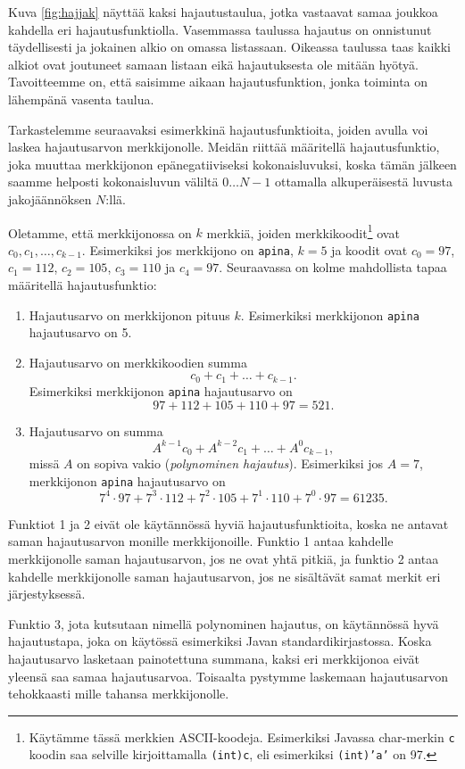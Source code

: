 Kuva \ref{fig:hajjak} näyttää kaksi hajautustaulua, jotka vastaavat
samaa joukkoa kahdella eri hajautusfunktiolla.
Vasemmassa taulussa hajautus on onnistunut täydellisesti
ja jokainen alkio on omassa listassaan.
Oikeassa taulussa taas kaikki alkiot ovat joutuneet samaan
listaan eikä hajautuksesta ole mitään hyötyä.
Tavoitteemme on, että saisimme aikaan hajautusfunktion,
jonka toiminta on lähempänä vasenta taulua.

Tarkastelemme seuraavaksi esimerkkinä hajautusfunktioita,
joiden avulla voi laskea hajautusarvon merkkijonolle.
Meidän riittää määritellä hajautusfunktio,
joka muuttaa merkkijonon epänegatiiviseksi kokonaisluvuksi,
koska tämän jälkeen saamme helposti kokonaisluvun
väliltä $0 \dots N-1$ ottamalla alkuperäisestä luvusta jakojäännöksen $N$:llä.

Oletamme, että merkkijonossa on $k$ merkkiä,
joiden merkkikoodit\footnote{Käytämme tässä merkkien ASCII-koodeja.
Esimerkiksi Javassa char-merkin \texttt{c} koodin saa
selville kirjoittamalla \texttt{(int)c}, eli esimerkiksi
\texttt{(int)'a'} on 97.} ovat $c_0,c_1,\dots,c_{k-1}$.
Esimerkiksi jos merkkijono on \texttt{apina},
$k=5$ ja koodit ovat $c_0=97$, $c_1=112$, $c_2=105$,
$c_3=110$ ja $c_4=97$.
Seuraavassa on kolme mahdollista tapaa määritellä hajautusfunktio:

\begin{enumerate}
\item Hajautusarvo on merkkijonon pituus $k$.
Esimerkiksi merkkijonon \texttt{apina} hajautusarvo on 5.
\item Hajautusarvo on merkkikoodien summa
\[ c_0 + c_1 + \dots + c_{k-1}.\]
Esimerkiksi merkkijonon \texttt{apina} hajautusarvo on
\[97+112+105+110+97=521.\]
\item Hajautusarvo on summa
\[ A^{k-1} c_0 + A^{k-2} c_1 + \dots + A^0 c_{k-1},\]
missä $A$ on sopiva vakio (\emph{polynominen hajautus}).
Esimerkiksi jos $A=7$, merkkijonon \texttt{apina} hajautusarvo on
\[7^4 \cdot 97+7^3 \cdot 112+7^2 \cdot 105+7^1 \cdot 110+7^0 \cdot 97=61235.\]
\end{enumerate}

Funktiot 1 ja 2 eivät ole käytännössä hyviä hajautusfunktioita,
koska ne antavat saman hajautusarvon monille merkkijonoille.
Funktio 1 antaa kahdelle merkkijonolle saman hajautusarvon,
jos ne ovat yhtä pitkiä,
ja funktio 2 antaa kahdelle merkkijonolle saman hajautusarvon,
jos ne sisältävät samat merkit eri järjestyksessä.

Funktio 3, jota kutsutaan nimellä polynominen hajautus,
on käytännössä hyvä hajautustapa, joka on käytössä esimerkiksi
Javan standardikirjastossa.
Koska hajautusarvo lasketaan painotettuna summana,
kaksi eri merkkijonoa eivät yleensä saa samaa hajautusarvoa.
Toisaalta pystymme laskemaan hajautusarvon tehokkaasti
mille tahansa merkkijonolle.

